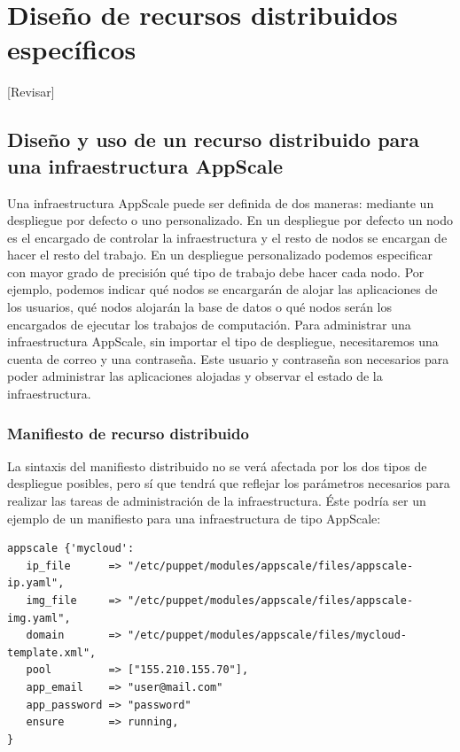 \chapter{Diseño de recursos distribuidos específicos}
\label{cap:disenyo}


[Revisar]\\

\section{Diseño y uso de un recurso distribuido para una infraestructura AppScale}

Una infraestructura AppScale puede ser definida de dos maneras: mediante un despliegue por defecto o uno personalizado. En un despliegue por defecto un nodo es el encargado de controlar la infraestructura y el resto de nodos se encargan de hacer el resto del trabajo. En un despliegue personalizado podemos especificar con mayor grado de precisión qué tipo de trabajo debe hacer cada nodo. Por ejemplo, podemos indicar qué nodos se encargarán de alojar las aplicaciones de los usuarios, qué nodos alojarán la base de datos o qué nodos serán los encargados de ejecutar los trabajos de computación. Para administrar una infraestructura AppScale, sin importar el tipo de despliegue, necesitaremos una cuenta de correo y una contraseña. Este usuario y contraseña son necesarios para poder administrar las aplicaciones alojadas y observar el estado de la infraestructura.

\subsection{Manifiesto de recurso distribuido}

La sintaxis del manifiesto distribuido no se verá afectada por los dos tipos de despliegue posibles, pero sí que tendrá que reflejar los parámetros necesarios para realizar las tareas de administración de la infraestructura. Éste podría ser un ejemplo de un manifiesto para una infraestructura de tipo AppScale:

\begin{lstlisting}
appscale {'mycloud':
   ip_file      => "/etc/puppet/modules/appscale/files/appscale-ip.yaml",
   img_file     => "/etc/puppet/modules/appscale/files/appscale-img.yaml",
   domain       => "/etc/puppet/modules/appscale/files/mycloud-template.xml",
   pool         => ["155.210.155.70"],
   app_email    => "user@mail.com"
   app_password => "password"
   ensure       => running,
}
\end{lstlisting}

